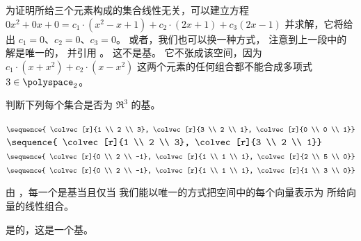 \begin{exercises}
\begin{answer}
\begin{exparts}
           为证明所给三个元素构成的集合线性无关，可以建立方程
           $0x^2+0x+0=c_1\cdot(x^2-x+1) +c_2\cdot(2x+1) +c_3(2x-1)$
           并求解，它将给出 $c_1=0$、$c_2=0$、$c_3=0$。
           或者，我们也可以换一种方式，
           注意到上一段中的解是唯一的，
           并引用 。
        \partsitem 这不是基。
           它不张成该空间，因为 $c_1\cdot (x+x^2) +c_2\cdot (x-x^2)$
           这两个元素的任何组合都不能合成多项式
           $3\in\polyspace_2$。
      \end{exparts}
    \end{answer}
  \recommended \item
    判断下列每个集合是否为 \( \Re^3 \) 的基。
    \begin{exparts*}
      \partsitem \( \sequence{
                 \colvec[r]{1 \\ 2 \\ 3},
                 \colvec[r]{3 \\ 2 \\ 1},
                 \colvec[r]{0 \\ 0 \\ 1}}  \)
      \partsitem \( \sequence{
                 \colvec[r]{1 \\ 2 \\ 3},
                 \colvec[r]{3 \\ 2 \\ 1}}  \)
      \partsitem \( \sequence{
                 \colvec[r]{0 \\ 2 \\ -1},
                 \colvec[r]{1 \\ 1 \\ 1},
                 \colvec[r]{2 \\ 5 \\ 0}}  \)
      \partsitem \( \sequence{
                 \colvec[r]{0 \\ 2 \\ -1},
                 \colvec[r]{1 \\ 1 \\ 1},
                 \colvec[r]{1 \\ 3 \\ 0}}  \)
    \end{exparts*}
    \begin{answer}
      由 ，每一个是基当且仅当
      我们能以唯一的方式把空间中的每个向量表示为
      所给向量的线性组合。
      \begin{exparts}
        \partsitem 是的，这是一个基。

\end{exparts}
\end{answer}
\end{exercises}
